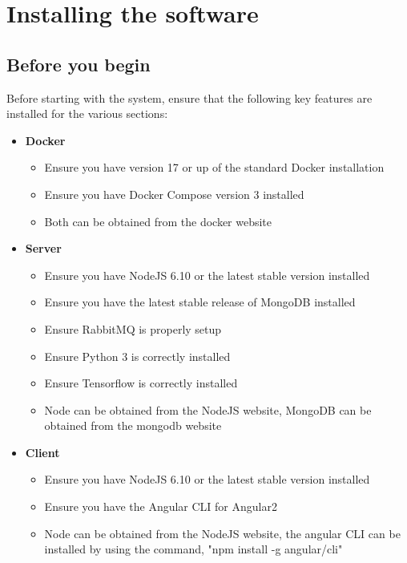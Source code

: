 \documentclass[a4paper,12pt]{article}
\begin{document}
  	\pagebreak
  	
    \section{Installing the software}

    	\subsection{Before you begin}
    	
    	Before starting with the system, ensure that the following key features are installed for the various sections:
    	
    	\begin{itemize}
    		\item \textbf{Docker}
    		\begin{itemize}
    			\item Ensure you have version 17 or up of the standard Docker installation
    			\item Ensure you have Docker Compose version 3 installed
    			\item Both can be obtained from the docker website
    		\end{itemize}
    	\end{itemize}
    
    	\begin{itemize}
	    	\item \textbf{Server}
	    	\begin{itemize}
	    		\item Ensure you have NodeJS 6.10 or the latest stable version installed
	    		\item Ensure you have the latest stable release of MongoDB installed
	    		\item Ensure RabbitMQ is properly setup
	    		\item Ensure Python 3 is correctly installed
	    		\item Ensure Tensorflow is correctly installed
	    		\item Node can be obtained from the NodeJS website, MongoDB can be obtained from the mongodb website
	    	\end{itemize}
    	\end{itemize}
    
       	\begin{itemize}
	    	\item \textbf{Client}
	    	\begin{itemize}
    			\item Ensure you have NodeJS 6.10 or the latest stable version installed
    			\item Ensure you have the Angular CLI for Angular2
	    		\item Node can be obtained from the NodeJS website, the angular CLI can be installed by using the command, "npm install -g angular/cli" 
	    	\end{itemize}
    	\end{itemize}
   	
\end{document}
